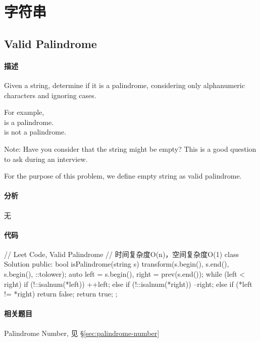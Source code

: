 \chapter{字符串}


\section{Valid Palindrome} %
\label{sec:valid-palindrome}


\subsubsection{描述}
Given a string, determine if it is a palindrome, considering only alphanumeric characters and ignoring cases.

For example,\\
 is a palindrome.\\
 is not a palindrome.

Note:
Have you consider that the string might be empty? This is a good question to ask during an interview.

For the purpose of this problem, we define empty string as valid palindrome.


\subsubsection{分析}
无


\subsubsection{代码}
\begin{Code}
// Leet Code, Valid Palindrome
// 时间复杂度O(n)，空间复杂度O(1)
class Solution {
public:
    bool isPalindrome(string s) {
        transform(s.begin(), s.end(), s.begin(), ::tolower);
        auto left = s.begin(), right = prev(s.end());
        while (left < right) {
            if (!::isalnum(*left))  ++left;
            else if (!::isalnum(*right)) --right;
            else if (*left != *right) return false;
        }
        return true;
    }
};
\end{Code}


\subsubsection{相关题目}
\begindot
\item Palindrome Number, 见 \S \ref{sec:palindrome-number}
\myenddot


